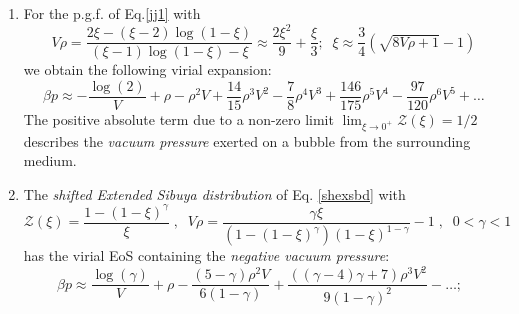 \documentclass[a4paper,12pt]{amsart}
\theoremstyle{definition}
\theoremstyle{remark}
\begin{document}
\begin{enumerate}[label=(\roman*), leftmargin=*]
\medskip
\item For the p.g.f. of Eq.\ref{jj1} with
\[ V\rho=
\frac{2 \xi -(\xi -2) \log (1-\xi )}{(\xi -1) \log (1-\xi )-\xi } \approx \frac{2 \xi ^2}{9}+\frac{\xi }{3};\;
\;\xi\approx \frac{3}{4} \left(\sqrt{8 V \rho +1}-1\right)
\]
we obtain the following virial expansion:
\[\beta p \approx -\frac{\log (2)}{V} +\rho -\rho ^2 V
+\frac{14 }{15}\rho ^3 V^2-\frac{7 }{8}\rho ^4 V^3
+\frac{146 }{175}\rho ^5 V^4
-\frac{97}{120} \rho ^6 V^5 + \ldots
\]
The positive absolute term due to a non-zero limit $\lim_{\xi\to 0^+} \mathcal{Z}(\xi)=1/2$ describes the {\it vacuum pressure} exerted on a bubble from the surrounding medium.
\medskip
\item The {\it shifted Extended Sibuya distribution} of Eq. \ref{shexsbd} with 
\[\mathcal{Z}(\xi)=\frac{1-(1-\xi)^{\gamma}}{\xi}\;,\;\;
V\rho =\frac{\gamma  \xi  }{(1-(1-\xi )^{\gamma })(1-\xi )^{1-\gamma}}-1\;,\;\; 0<\gamma<1\]
has the virial EoS containing the {\it negative vacuum pressure}:
\[\beta p\approx 
\frac{\log (\gamma )}{V}+\rho  -\frac{(5-\gamma) \rho ^2 V}{6 (1-\gamma)}+
\frac{((\gamma -4) \gamma +7) \rho ^3 V^2}{9 (1-\gamma )^2}
- \ldots;\;\;\]
 
\end{enumerate}
\end{document}
